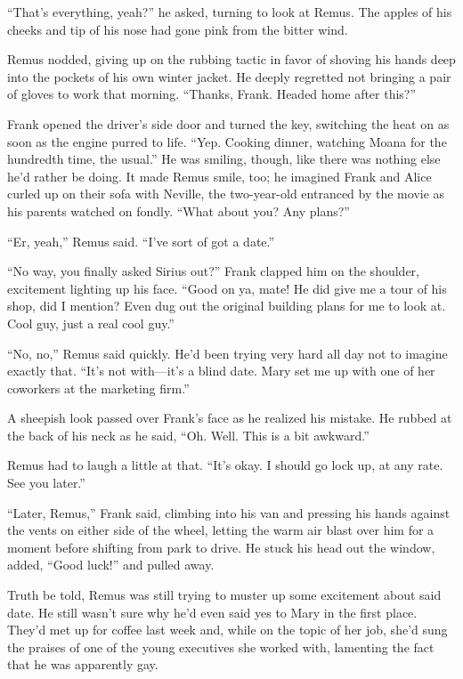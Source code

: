 “That’s everything, yeah?” he asked, turning to look at Remus. The apples of his cheeks and tip of his nose had gone pink from the bitter wind.

Remus nodded, giving up on the rubbing tactic in favor of shoving his hands deep into the pockets of his own winter jacket. He deeply regretted not bringing a pair of gloves to work that morning. “Thanks, Frank. Headed home after this?”

Frank opened the driver’s side door and turned the key, switching the heat on as soon as the engine purred to life. “Yep. Cooking dinner, watching Moana for the hundredth time, the usual.” He was smiling, though, like there was nothing else he’d rather be doing. It made Remus smile, too; he imagined Frank and Alice curled up on their sofa with Neville, the two-year-old entranced by the movie as his parents watched on fondly. “What about you? Any plans?”

“Er, yeah,” Remus said. “I’ve sort of got a date.”

“No way, you finally asked Sirius out?” Frank clapped him on the shoulder, excitement lighting up his face. “Good on ya, mate! He did give me a tour of his shop, did I mention? Even dug out the original building plans for me to look at. Cool guy, just a real cool guy.”

“No, no,” Remus said quickly. He’d been trying very hard all day not to imagine exactly that. “It’s not with—it’s a blind date. Mary set me up with one of her coworkers at the marketing firm.”

A sheepish look passed over Frank’s face as he realized his mistake. He rubbed at the back of his neck as he said, “Oh. Well. This is a bit awkward.”

Remus had to laugh a little at that. “It’s okay. I should go lock up, at any rate. See you later.”

“Later, Remus,” Frank said, climbing into his van and pressing his hands against the vents on either side of the wheel, letting the warm air blast over him for a moment before shifting from park to drive. He stuck his head out the window, added, “Good luck!” and pulled away.

Truth be told, Remus was still trying to muster up some excitement about said date. He still wasn’t sure why he’d even said yes to Mary in the first place. They’d met up for coffee last week and, while on the topic of her job, she’d sung the praises of one of the young executives she worked with, lamenting the fact that he was apparently gay.

